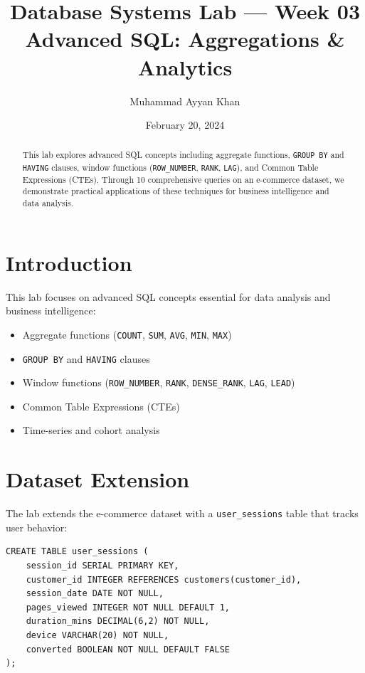\documentclass[11pt,a4paper]{article}
\title{\textbf{\Large Database Systems Lab — Week 03}\\[0.5cm]
\Large Advanced SQL: Aggregations \& Analytics}
\author{Muhammad Ayyan Khan}
\date{February 20, 2024}
\begin{document}
\maketitle

\begin{abstract}
\noindent This lab explores advanced SQL concepts including aggregate functions, \texttt{GROUP BY} and \texttt{HAVING} clauses, window functions (\texttt{ROW\_NUMBER}, \texttt{RANK}, \texttt{LAG}), and Common Table Expressions (CTEs). Through 10 comprehensive queries on an e-commerce dataset, we demonstrate practical applications of these techniques for business intelligence and data analysis.
\end{abstract}

\tableofcontents
\newpage

\section{Introduction}

This lab focuses on advanced SQL concepts essential for data analysis and business intelligence:
\begin{itemize}[noitemsep]
    \item Aggregate functions (\texttt{COUNT}, \texttt{SUM}, \texttt{AVG}, \texttt{MIN}, \texttt{MAX})
    \item \texttt{GROUP BY} and \texttt{HAVING} clauses
    \item Window functions (\texttt{ROW\_NUMBER}, \texttt{RANK}, \texttt{DENSE\_RANK}, \texttt{LAG}, \texttt{LEAD})
    \item Common Table Expressions (CTEs)
    \item Time-series and cohort analysis
\end{itemize}

\section{Dataset Extension}

The lab extends the e-commerce dataset with a \texttt{user\_sessions} table that tracks user behavior:

\begin{lstlisting}[caption={User Sessions Table Schema}, label=lst:schema]
CREATE TABLE user_sessions (
    session_id SERIAL PRIMARY KEY,
    customer_id INTEGER REFERENCES customers(customer_id),
    session_date DATE NOT NULL,
    pages_viewed INTEGER NOT NULL DEFAULT 1,
    duration_mins DECIMAL(6,2) NOT NULL,
    device VARCHAR(20) NOT NULL,
    converted BOOLEAN NOT NULL DEFAULT FALSE
);
\end{lstlisting}
\end{document}
